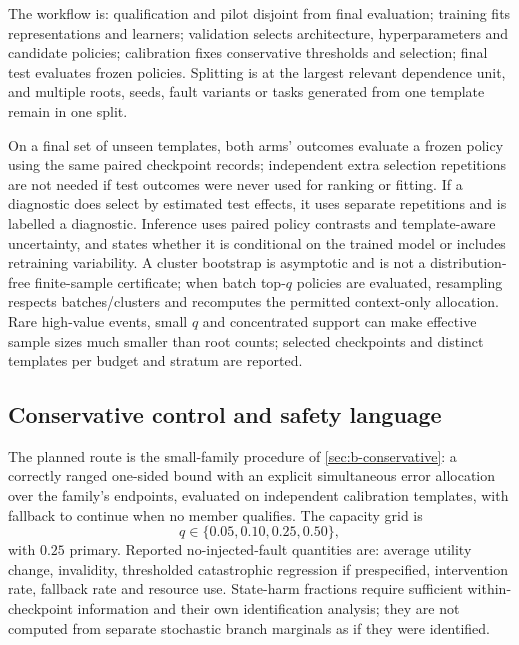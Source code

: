 The workflow is: qualification and pilot disjoint from final evaluation;
training fits representations and learners; validation selects architecture,
hyperparameters and candidate policies; calibration fixes conservative
thresholds and selection; final test evaluates frozen policies.  Splitting is at
the largest relevant dependence unit, and multiple roots, seeds, fault variants
or tasks generated from one template remain in one split.

On a final set of unseen templates, both arms' outcomes evaluate a frozen policy
using the same paired checkpoint records; independent extra selection
repetitions are not needed if test outcomes were never used for ranking or
fitting.  If a diagnostic does select by estimated test effects, it uses
separate repetitions and is labelled a diagnostic.  Inference uses paired
policy contrasts and template-aware uncertainty, and states whether it is
conditional on the trained model or includes retraining variability.  A cluster
bootstrap is asymptotic and is not a distribution-free finite-sample
certificate; when batch top-$q$ policies are evaluated, resampling respects
batches/clusters and recomputes the permitted context-only allocation.  Rare
high-value events, small $q$ and concentrated support can make effective sample
sizes much smaller than root counts; selected checkpoints and distinct templates
per budget and stratum are reported.

\subsection{Conservative control and safety language}

The planned route is the small-family procedure of \cref{sec:b-conservative}:
a correctly ranged one-sided bound with an explicit simultaneous error
allocation over the family's endpoints, evaluated on independent calibration
templates, with fallback to continue when no member qualifies.  The capacity
grid is
\begin{equation}
 q\in\{0.05,0.10,0.25,0.50\},
 \label{eq:main-capacities}
\end{equation}
with $0.25$ primary.  Reported no-injected-fault quantities are: average utility
change, invalidity, thresholded catastrophic regression if prespecified,
intervention rate, fallback rate and resource use.  State-harm fractions require
sufficient within-checkpoint information and their own identification analysis;
they are not computed from separate stochastic branch marginals as if they were
identified.
